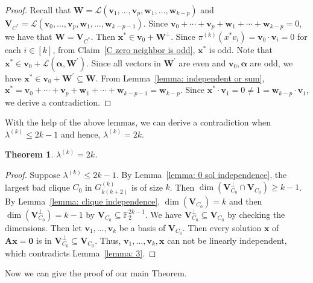 \documentclass[
final
]{dmtcs-episciences}
\newtheorem{theorem}{Theorem}[section]
\begin{document}
\begin{proof}
 Recall that $\mathbf{W} = \mathcal{L}(\mathbf{v}_1, \ldots, \mathbf{v}_p, \mathbf{w}_1, \ldots, \mathbf{w}_{k-p})$ and $\mathbf{V}_{C^*} = \mathcal{L}(\mathbf{v}_0, \ldots, \mathbf{v}_p, \mathbf{w}_1, \ldots, \mathbf{w}_{k-p-1})$. 
 Since $ \textbf{v}_0+\cdots+\textbf{v}_p+\textbf{w}_1+\cdots+\textbf{w}_{k-p}=0 $, we have that $\mathbf{W}=\textbf{V}_{C^*}$.
  Then $\textbf{x}^*\in \textbf{v}_0 + \mathbf{W}^{\perp}$. Since $\pi^{(k)}(x^* v_i) =\textbf{v}_0\cdot \textbf{v}_i=0$ for each $i\in [k]$,
  from Claim~\ref{C zero neighbor is odd}, $\textbf{x}^*$ is odd. Note that $\textbf{x}^*\in \textbf{v}_0+\mathcal{L}(\boldsymbol{\alpha},\mathbf{W}^{\prime})$. Since all vectors in $\mathbf{W}^{\prime}$ are  even and $\textbf{v}_0,\boldsymbol{\alpha}$ are odd, we have $\textbf{x}^*\in \textbf{v}_0+\mathbf{W}^{\prime}\subseteq \mathbf{W}$.
  From Lemma~\ref{lemma: independent or sum}, $\textbf{x}^*= \textbf{v}_0+\cdots+\textbf{v}_p+\textbf{w}_1+\cdots+\textbf{w}_{k-p-1}=\textbf{w}_{k-p}$. Since $\textbf{x}^{*}\cdot \mathbf{v}_1=0\neq 1=\textbf{w}_{k-p}\cdot \mathbf{v}_1$, we derive a contradiction.
\end{proof}

With the help of the above lemmas, we can derive a contradiction when $\lambda^{(k)} \le  2k-1$ and hence, $\lambda^{(k)} = 2k$.

\begin{theorem}\label{thm: lambda}
    $\lambda^{(k)} = 2k$.
\end{theorem}

\begin{proof}
    Suppose $\lambda^{(k)} \le 2k-1$. By Lemma~\ref{lemma: 0 sol independence}, the largest bad clique $C_0$ in $G^{(k)}_{k(k+2)}$ is of size $k$. Then $\dim(\textbf{V}_{C_0}^{\perp}\cap \textbf{V}_{C_0})\ge k-1$. By Lemma~\ref{lemma: clique independence}, $\dim(\textbf{V}_{C_0})=k$ and then $\dim(\textbf{V}_{C_0}^{\perp})=k-1$ by $\textbf{V}_{C_0}\subseteq \mathbb{F}_2^{2k-1}$.
    We have $\textbf{V}_{C_0}^{\perp}\subseteq \textbf{V}_{C_0}$ by checking the dimensions. 
    Then let $\mathbf{v}_1, \ldots, \mathbf{v}_k$ be a basis of $\textbf{V}_{C_0}$. 
    Then every solution $\mathbf{x}$ of $\mathbf{Ax} = \mathbf{0}$ is in $\textbf{V}_{C_0}^{\perp} \subseteq \textbf{V}_{C_0}$.
    Thus, $\mathbf{v}_1, \ldots, \mathbf{v}_k, \mathbf{x}$ can not be linearly independent, which contradicts Lemma~\ref{lemma: 3}.
\end{proof}

Now we can give the proof of our main Theorem.
\end{document}
